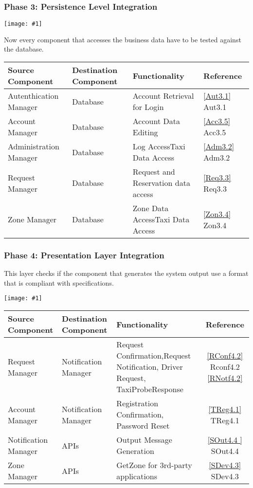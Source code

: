 \documentclass[11pt, a4paper,titlepage]{article}
\newcommand{\image}[1]{
	\begin{center}
		\noindent \texttt{[image: \#1]}
	\end{center}
}
\begin{document}
	\subsubsection{Phase 3: Persistence Level Integration}
	\image{test_phase3.png}
	Now every component that accesses the business data have to be tested against the database.
	\newline
	\begin{tabularx}{\textwidth}{| X |X |X |l|}
		\hline \textbf{Source Component} &\textbf{ Destination Component}&\textbf{Functionality} & \textbf{Reference} \\
		\hline Autenthication Manager & Database & Account Retrieval for Login & \ref{Aut3.1} Aut3.1\\
		\hline Account Manager & Database & Account Data Editing & \ref{Acc3.5} Acc3.5\\
		\hline Administration Manager & Database & Log Access\newline Taxi Data Access & \ref{Adm3.2} Adm3.2\\
		\hline Request Manager & Database & Request and Reservation data access & \ref{Req3.3} Req3.3\\
		\hline Zone Manager & Database & Zone Data Access\newline Taxi Data Access & \ref{Zon3.4} Zon3.4\\
		\hline
	\end{tabularx}
	\newline
	\newpage
	\subsubsection{Phase 4: Presentation Layer Integration}
	This layer checks if the component that generates the system output use a format that is compliant with specifications.
	\newline
	\image{test_phase4.png}
	\begin{tabularx}{\textwidth}{| X |X |X |c|}
		\hline \textbf{Source Component} &\textbf{ Destination Component}&\textbf{Functionality} & \textbf{Reference} \\
		\hline Request Manager & Notification Manager & Request Confirmation,\newline Request Notification, Driver Request,  TaxiProbeResponse & \ref{RConf4.2} Rconf4.2 \newline \ref{RNotf4.2}\\
		\hline Account Manager & Notification Manager & Registration Confirmation, Password Reset & \ref{TReg4.1} TReg4.1\\
		\hline Notification Manager & APIs & Output Message Generation & \ref{SOut4.4 } SOut4.4\\
		\hline Zone Manager & APIs & GetZone for 3rd-party applications & \ref{SDev4.3} SDev4.3\\
		\hline
	\end{tabularx}	
	\newpage
\end{document}
